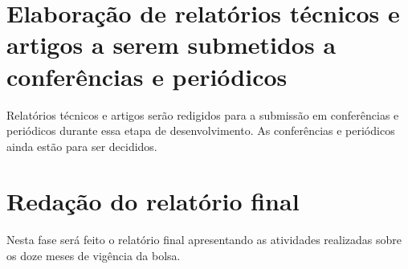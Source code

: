 \documentclass[12pt]{report}
\begin{document}
\section{Elaboração de relatórios técnicos e artigos a serem submetidos a conferências e periódicos}
Relatórios técnicos e artigos serão redigidos para a submissão em conferências e periódicos durante essa etapa de desenvolvimento. As conferências e periódicos ainda estão para ser decididos.

\section{Redação do relatório final}
Nesta fase será feito o relatório final apresentando as atividades realizadas sobre os doze meses de vigência da bolsa.





\end{document}
